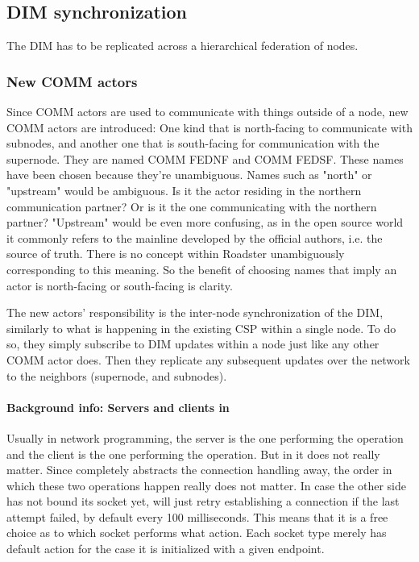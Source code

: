 \subsection{DIM synchronization}
The DIM has to be replicated across a hierarchical federation of nodes.

\subsubsection{New COMM actors}
Since COMM actors are used to communicate with things outside of a node, new COMM
actors are introduced: One kind that is north-facing to communicate
with subnodes, and another one that is south-facing for communication with the
supernode. They are named COMM FEDNF and COMM FEDSF. These names have been
chosen because they're unambiguous. Names such as "north" or "upstream" would
be ambiguous. Is it the actor residing in the northern communication partner?
Or is it the one communicating with the northern partner? "Upstream" would be
even more confusing, as in the open source world it commonly refers to the
mainline developed by the official authors, i.e. the source of truth. There is
no concept within Roadster unambiguously corresponding to this meaning. So the
benefit of choosing names that imply an actor is north-facing or south-facing
is clarity.

The new actors' responsibility is the inter-node synchronization of the DIM,
similarly to what is happening in the existing \gls{CSP} within a single node.
To do so, they simply subscribe to DIM updates within a node just like any
other COMM actor does.  Then they replicate any subsequent updates over the network
to the neighbors (supernode, and subnodes).

\paragraph{Background info: Servers and clients in \zmq}
Usually in network programming, the server is the one performing the
 operation and the client is the one performing the 
operation. But in \zmq it does not really matter. Since \zmq completely
abstracts the connection handling away, the order in which these two operations
happen really does not matter. In case the other side has not bound its socket
yet, \zmq will just retry establishing a connection if the last attempt failed,
by default every 100 milliseconds. This means that it is a free choice as to which socket
performs what action. Each socket type merely has default action for the case
it is initialized with a given endpoint.

